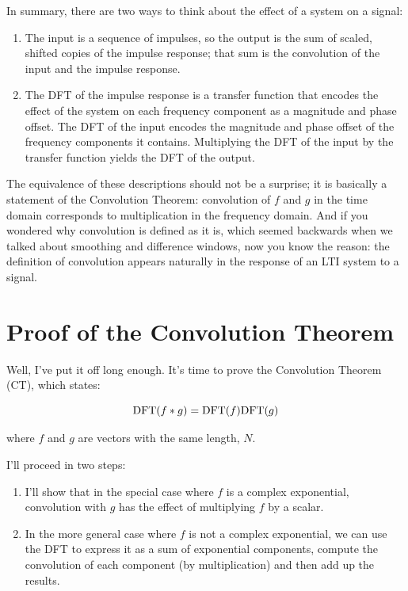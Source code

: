\documentclass[12pt]{book}
\begin{document}
In summary, there are two ways to think about the effect of a system
on a signal:

\begin{enumerate}

\item The input is a sequence of impulses, so the output is the sum of
  scaled, shifted copies of the impulse response; that sum is the
  convolution of the input and the impulse response.

\item The DFT of the impulse response is a transfer function that
  encodes the effect of the system on each frequency component as a
  magnitude and phase offset.  The DFT of the input encodes the
  magnitude and phase offset of the frequency components it contains.
  Multiplying the DFT of the input by the transfer function yields
  the DFT of the output.

\end{enumerate}

The equivalence of these descriptions should not be a surprise;
it is basically a statement of the Convolution Theorem:
convolution of $f$ and $g$ in the time
domain corresponds to multiplication in the frequency domain.
And if you wondered why convolution is defined as it is, which
seemed backwards when we talked about smoothing and difference
windows, now you know the reason: the definition of convolution
appears naturally in the response of an LTI system to a signal.


\section{Proof of the Convolution Theorem}

Well, I've put it off long enough.  It's time to prove the Convolution
Theorem (CT), which states:

\[ \mathrm{DFT}(f \ast g) = \mathrm{DFT}(f) \mathrm{DFT}(g) \]

where $f$ and $g$ are vectors with the same length, $N$.

I'll proceed in two steps:

\begin{enumerate}

\item I'll show that in the special case where $f$ is a complex
exponential, convolution with $g$ has the effect of multiplying
$f$ by a scalar.  

\item In the more general case where $f$ is not a complex exponential,
we can use the DFT to express it as a sum of exponential components,
compute the convolution of each component (by multiplication) and
then add up the results.

\end{enumerate}
\end{document}
